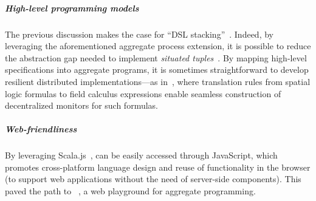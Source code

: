 \subparagraph*{High-level programming models}
%
The previous discussion  
 makes the case for ``DSL stacking''~\cite{DBLP:conf/icsoft/HummE10}.
%
Indeed, by leveraging the aforementioned aggregate process extension, 
 it is possible to reduce the abstraction gap
 needed to implement \emph{situated tuples}~\cite{DBLP:conf/coordination/CasadeiVRA21}.
%
By mapping high-level specifications into aggregate programs, it is sometimes straightforward to develop resilient distributed implementations---as in~\cite{DBLP:journals/jss/AudritoCDSV21},
 where translation rules from 
 spatial logic formulas
 to field calculus expressions
 enable seamless construction of decentralized monitors for such formulas.

\subparagraph*{Web-friendliness}
%
By leveraging Scala.js~\cite{DBLP:conf/scala/Doeraene18}, \scafi{} can be easily 
 accessed through JavaScript,
 which promotes cross-platform language design 
 and reuse of functionality in the browser
 (to support web applications without the need of server-side components).
%
This paved the path 
 to \scafiweb{}~\cite{DBLP:conf/coordination/AguzziCMPV21},
 a web playground for aggregate programming.
%

